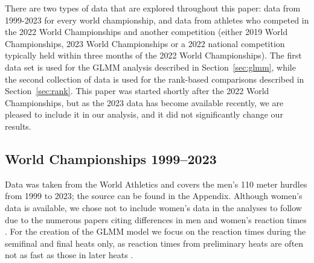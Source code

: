\documentclass[12pt, letterpaper, titlepage]{article}
\newcommand{\eds}[1]{\textcolor{red}{EDS: (#1)}}
\newcommand{\of}[1]{\textcolor{violet}{OF: #1}}
\begin{document}
There are two types of data that are explored throughout this paper: data from
1999-2023 for every world championship, and data from athletes who competed in
the 2022 World Championships and another competition (either 2019 World 
Championships, 2023 World Championships or a 2022 national competition typically
held within three months of the 2022 World Championships). 
The first data set is used for the GLMM analysis described in 
Section~\ref{sec:glmm}, while the second collection of data is used for the 
rank-based comparisons described in Section~\ref{sec:rank}.  This paper was
started shortly after the 2022 World Championships, but as the 2023 data has 
become available recently, we are pleased to include it in our analysis, and it
did not significantly change our results.


\subsection{World Championships 1999--2023}\label{sec:dataworld}


Data was taken from the World Athletics 
and covers the men's 110 meter hurdles from 1999 to 2023; the source can be 
found in the Appendix.
Although women's data is available, we chose not to include women's data in the
analyses to follow due to the numerous papers citing differences in men and
women's reaction times \citep[e.g.,][]{lipps2011implications, 
babicc2009reaction, panoutsakopoulos2020gender}.
For the creation of the GLMM model we focus on the reaction times during the 
semifinal and final heats only, as reaction times from preliminary heats are 
often not as fast as those in later heats \citep[e.g.,][]{zhang2021correlation}. 
\end{document}
